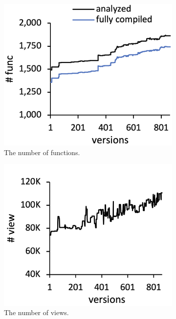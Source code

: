 \begin{figure}
  \centering
  \begin{subfigure}[b]{0.24\textwidth}
    \includegraphics[width=\textwidth]{img/func}
    \caption{The number of functions.}
  \end{subfigure}
  \begin{subfigure}[b]{0.24\textwidth}
    \includegraphics[width=\textwidth]{img/view}
    \caption{The number of views.}
  \end{subfigure}
  \begin{subfigure}[b]{0.24\textwidth}

\end{subfigure}
\end{figure}

